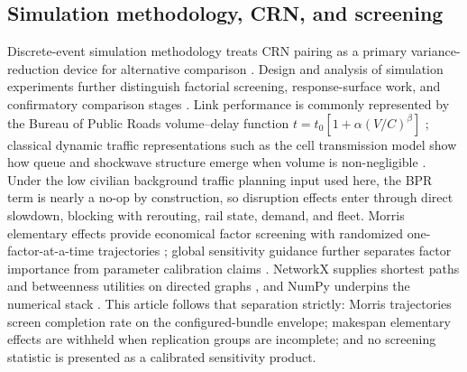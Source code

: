 \documentclass{ieeeaccess}
\begin{document}
\subsection{Simulation methodology, CRN, and screening}
Discrete-event simulation methodology treats CRN pairing as a primary variance-reduction device for alternative comparison \cite{b11}. Design and analysis of simulation experiments further distinguish factorial screening, response-surface work, and confirmatory comparison stages \cite{b23}. Link performance is commonly represented by the Bureau of Public Roads volume--delay function $t=t_0[1+\alpha(V/C)^{\beta}]$ \cite{b5,b16}; classical dynamic traffic representations such as the cell transmission model show how queue and shockwave structure emerge when volume is non-negligible \cite{b6}. Under the low civilian background traffic planning input used here, the BPR term is nearly a no-op by construction, so disruption effects enter through direct slowdown, blocking with rerouting, rail state, demand, and fleet. Morris elementary effects provide economical factor screening with randomized one-factor-at-a-time trajectories \cite{b12}; global sensitivity guidance further separates factor importance from parameter calibration claims \cite{b22}. NetworkX supplies shortest paths and betweenness utilities on directed graphs \cite{b8}, and NumPy underpins the numerical stack \cite{b9}. This article follows that separation strictly: Morris trajectories screen completion rate on the configured-bundle envelope; makespan elementary effects are withheld when replication groups are incomplete; and no screening statistic is presented as a calibrated sensitivity product.
\end{document}
